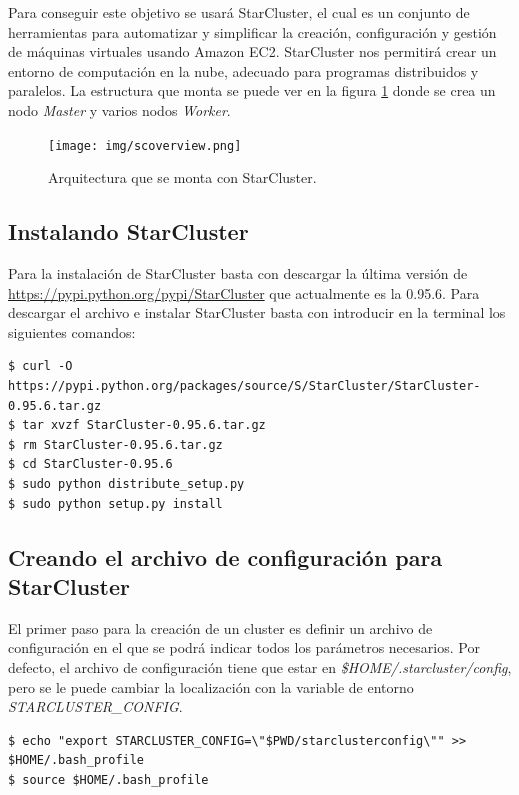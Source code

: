 \documentclass{article}
\begin{document}
	Para conseguir este objetivo se usará StarCluster, el cual es un conjunto de herramientas para automatizar y simplificar la creación, configuración y gestión de máquinas virtuales usando Amazon EC2. StarCluster nos permitirá crear un entorno de computación en la nube, adecuado para programas distribuidos y paralelos. La estructura que monta se puede ver en la figura \ref{fig:StarClusterOverview} donde se crea un nodo \emph{Master} y varios nodos \emph{Worker}.

\begin{figure}[h]
  \centering
    \texttt{[image: img/scoverview.png]}
  \caption{Arquitectura que se monta con StarCluster.}
  \label{fig:StarClusterOverview}
\end{figure}

\subsection{Instalando StarCluster}\label{sec:InstallStarCluster}
	Para la instalación de StarCluster basta con descargar la última versión de \url{https://pypi.python.org/pypi/StarCluster} que actualmente es la 0.95.6. Para descargar el archivo e instalar StarCluster basta con introducir en la terminal los siguientes comandos\cite{InstallingStarCluster}:
\begin{lstlisting}[style=minibash]
$ curl -O https://pypi.python.org/packages/source/S/StarCluster/StarCluster-0.95.6.tar.gz
$ tar xvzf StarCluster-0.95.6.tar.gz
$ rm StarCluster-0.95.6.tar.gz
$ cd StarCluster-0.95.6
$ sudo python distribute_setup.py
$ sudo python setup.py install
\end{lstlisting}

\subsection{Creando el archivo de configuración para StarCluster}
	El primer paso para la creación de un cluster es definir un archivo de configuración en el que se podrá indicar todos los parámetros necesarios. Por defecto, el archivo de configuración tiene que estar en \emph{\$HOME/.starcluster/config}, pero se le puede cambiar la localización con la variable de entorno \emph{STARCLUSTER\_CONFIG}\cite{StarClusterUserManual}.
\begin{lstlisting}[style=minibash]
$ echo "export STARCLUSTER_CONFIG=\"$PWD/starclusterconfig\"" >> $HOME/.bash_profile 
$ source $HOME/.bash_profile
\end{lstlisting}
\end{document}
